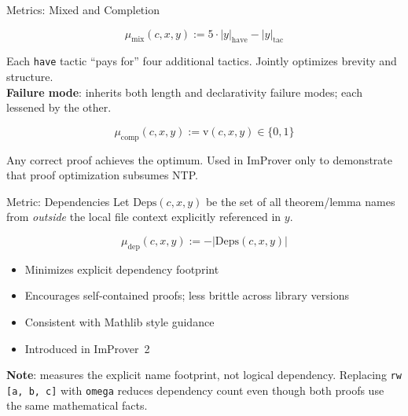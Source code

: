 \begin{frame}{Metrics: Mixed and Completion}
\vspace{0.5em}
\begin{definition}
\[
  \mu_{\mathrm{mix}}(c,x,y) := 5\cdot|y|_{\mathrm{have}} - |y|_{\mathrm{tac}}
\]
\end{definition}
\small Each \texttt{have} tactic ``pays for'' four additional tactics. Jointly optimizes brevity and structure.\\[0.5em]
\textbf{Failure mode}: inherits both length and declarativity failure modes; each lessened by the other.
\vspace{0.6em}
\begin{definition}
\[
  \mu_{\mathrm{comp}}(c,x,y) := \mathrm{v}(c,x,y) \in \{0,1\}
\]
\end{definition}
\small Any correct proof achieves the optimum. Used in ImProver only to demonstrate that proof optimization subsumes NTP.
\end{frame}

\begin{frame}{Metric: Dependencies}
\vspace{0.4em}
Let $\mathrm{Deps}(c,x,y)$ be the set of all theorem/lemma names from \emph{outside} the local file context explicitly referenced in $y$.
\vspace{0.4em}
\begin{definition}
\[
  \mu_{\mathrm{dep}}(c, x, y) := -\left|\mathrm{Deps}(c, x, y)\right|
\]
\end{definition}
\vspace{0.4em}
\begin{itemize}\setlength{\itemsep}{8pt}
  \item Minimizes explicit dependency footprint
  \item Encourages self-contained proofs; less brittle across library versions
  \item Consistent with Mathlib style guidance
  \item Introduced in ImProver~2
\end{itemize}
\vspace{0.4em}
\textbf{Note}: measures the explicit name footprint, not logical dependency. Replacing \texttt{rw [a, b, c]} with \texttt{omega} reduces dependency count even though both proofs use the same mathematical facts.
\end{frame}

